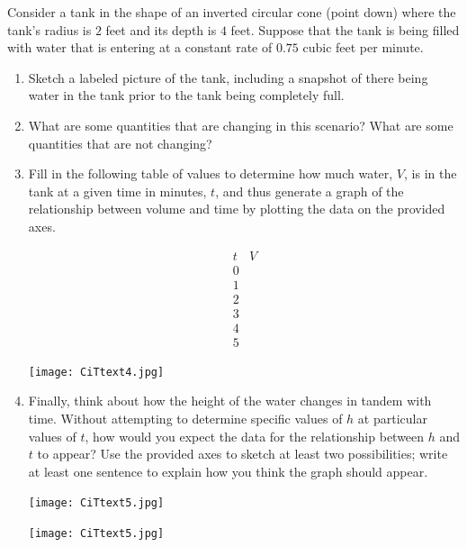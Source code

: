 \documentclass{ximera}
\begin{document}
\begin{exploration}
Consider a tank in the shape of an inverted circular cone (point down) where the tank's radius is $2$ feet and its depth is $4$ feet.  Suppose that the tank is being filled with water that is entering at a constant rate of $0.75$ cubic feet per minute.%
\begin{enumerate}[label=\alph*.]
\item Sketch a labeled picture of the tank, including a snapshot of there being water in the tank prior to the tank being completely full.%
\item What are some quantities that are changing in this scenario?  What are some quantities that are not changing?%
\item Fill in the following table of values to determine how much water, $V$, is in the tank at a given time in minutes, $t$, and thus generate a graph of the relationship between volume and time by plotting the data on the provided axes.%

$$
\begin{array}{cc}
t&V\\
\hline
0&\\
1&\\
2&\\
3&\\
4&\\
5&
\end{array}
$$


\begin{image}
\texttt{[image: CiTtext4.jpg]}
\end{image}

\item Finally, think about how the height of the water changes in tandem with time.  Without attempting to determine specific values of $h$ at particular values of $t$, how would you expect the data for the relationship between $h$ and $t$ to appear?  Use the provided axes to sketch at least two possibilities; write at least one sentence to explain how you think the graph should appear.%


\begin{image}
\texttt{[image: CiTtext5.jpg]}
\end{image}


\begin{image}
\texttt{[image: CiTtext5.jpg]}
\end{image}

\end{enumerate}
\end{exploration}
\end{document}
